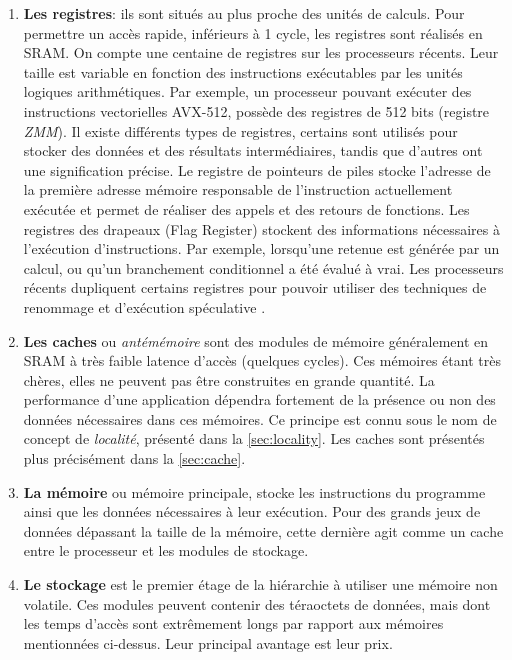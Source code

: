         \begin{enumerate}
            
            \item \textbf{Les registres}: ils sont situés au plus proche des unités de calculs. Pour permettre un accès rapide, inférieurs à 1 cycle, les registres sont réalisés en SRAM. On compte une centaine de registres sur les processeurs récents. Leur taille est variable en fonction des instructions exécutables par les unités logiques arithmétiques. Par exemple, un processeur pouvant exécuter des instructions vectorielles AVX-512, possède des registres de 512 bits (registre \textit{ZMM}). Il existe différents types de registres, certains sont utilisés pour stocker des données et des résultats intermédiaires, tandis que d'autres ont une signification précise. Le registre de pointeurs de piles stocke l'adresse de la première adresse mémoire responsable de l'instruction actuellement exécutée et permet de réaliser des appels et des retours de fonctions. Les registres des drapeaux (Flag Register) stockent des informations nécessaires à l'exécution d'instructions. Par exemple, lorsqu'une retenue est générée par un calcul, ou qu'un branchement conditionnel a été évalué à vrai. Les processeurs récents dupliquent certains registres pour pouvoir utiliser des techniques de renommage \cite{moudgill1993register} et d'exécution spéculative \cite{chou2004efficient}.
        
            \item \textbf{Les caches} ou \textit{antémémoire} sont des modules de mémoire généralement en SRAM à très faible latence d'accès (quelques  cycles). Ces mémoires étant très chères, elles ne peuvent pas être construites en grande quantité. La performance d'une application dépendra fortement de la présence ou non des données nécessaires dans ces mémoires. Ce principe est connu sous le nom de concept de \textit{localité}, présenté dans la \autoref{sec:locality}. Les caches sont présentés plus précisément dans la \autoref{sec:cache}.
            
            \item \textbf{La mémoire} ou mémoire principale, stocke les instructions du programme ainsi que les données nécessaires à leur exécution. Pour des grands jeux de données dépassant la taille de la mémoire, cette dernière agit comme un cache entre le processeur et les modules de stockage.
            
            \item \textbf{Le stockage} est le premier étage de la hiérarchie à utiliser une mémoire non volatile. Ces modules peuvent contenir des téraoctets de données, mais dont les temps d'accès sont extrêmement longs par rapport aux mémoires mentionnées ci-dessus. Leur principal avantage est leur prix.
            

\end{enumerate}
